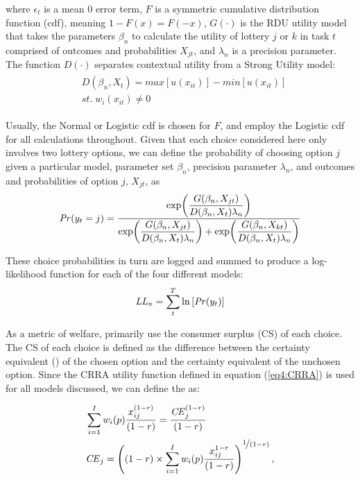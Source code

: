 \documentclass[../main.tex]{subfiles}
\begin{document}
\noindent where $\epsilon_t$ is a mean 0 error term, $F$ is a symmetric cumulative distribution function (cdf), meaning $1 - F(x)  = F(-x)$, $G(\cdot)$ is the RDU utility model that takes the parameters $\beta_n$ to calculate the utility of lottery $j$ or $k$ in task $t$ comprised of outcomes and probabilities $X_{jt}$, and $\lambda_n$ is a precision parameter.
The function $D(\cdot)$ separates contextual utility from a Strong Utility model:
\begin{align}
	\label{eq4:W.cu}
	\begin{split}
		&D(\beta_n,X_t) = \mathit{max}[u(x_{it})] - \mathit{min}[u(x_{it})]\\
		&\mathit{st.}\; w_i(x_{it}) \neq 0
	\end{split}
\end{align}

Usually, the Normal or Logistic cdf is chosen for $F$, and employ the Logistic cdf for all calculations throughout.
Given that each choice considered here only involves two lottery options, we can define the probability of choosing option $j$ given a particular model, parameter set $\beta_n$, precision parameter $\lambda_n$, and outcomes and probabilities of option $j$, $X_{jt}$, as
\begin{equation}
	\label{eq4:RE.f}
	{\ensuremath{\mathit{Pr}}}(y_t=j) =\dfrac{\exp\!\left( \dfrac{ G(\beta_n,X_{jt}) }{ D(\beta_n,X_{t})\lambda_n }  \right)}{  \exp\!\left( \dfrac{ G(\beta_n,X_{jt}) }{ D(\beta_n,X_{t})\lambda_n }  \right) + \exp\!\left( \dfrac{ G(\beta_n,X_{kt}) }{ D(\beta_n,X_{t})\lambda_n }  \right)    }
\end{equation}

\noindent These choice probabilities in turn are logged and summed to produce a log-likelihood function for each of the four different models:
\begin{equation}
	\label{eq4:ll}
	\mathit{LL_n} = \sum_{t}^T \ln \left[ {\mathit{Pr}}(y_t) \right]
\end{equation}

As a metric of welfare, \textcite{Harrison2016} primarily use the consumer surplus (CS) of each choice.
The CS of each choice is defined as the difference between the certainty equivalent ({\CE}) of the chosen option and the certainty equivalent of the unchosen option.
Since the CRRA utility function defined in equation (\ref{eq4:CRRA}) is used for all models discussed, we can define the {\CE} as:

\begin{align}
	\label{eq4:CEcalc}
	\begin{split}
		&\sum_{i=1}^{I} w_i(p) \frac{x_{ij}^{(1-r)}}{(1-r)} = \frac{ {\mathit{CE}}_j^{(1-r)}}{(1-r)}\\
		&{\mathit{CE}}_j =  \left( (1-r) \times \sum_{i=1}^{I} w_i(p) \frac{x_{ij}^{1-r}}{(1-r)} \right)^{ \displaystyle\nicefrac{1}{(1-r)} } ,
	\end{split}
\end{align}
\end{document}
